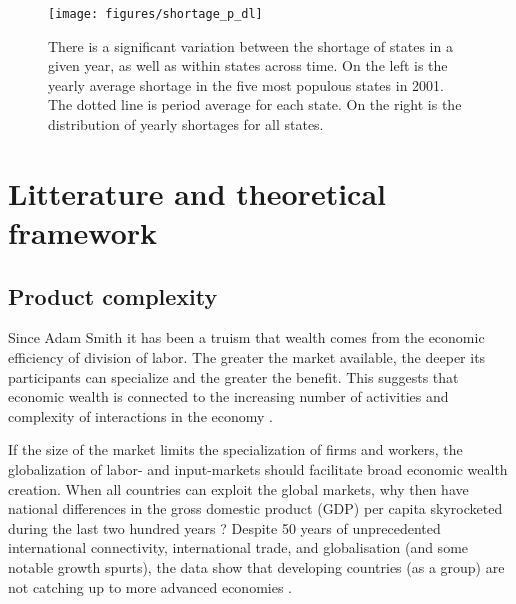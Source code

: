 \documentclass[11pt]{article}
\begin{document}
\begin{figure}[htpb]
	\centering
	\label{fig:shortage_p_dl}
	\texttt{[image: figures/shortage\_p\_dl]}
	\caption[Variation in electricity shortages in Indian states]{There is a significant variation between the shortage of states in a given year, as well as within states across time. On the left is the yearly average shortage in the five most populous states in 2001. The dotted line is period average for each state. On the right is the distribution of yearly shortages for all states.}%
	\label{fig:shortage_dist}
\end{figure}


\newpage

\section{Litterature and theoretical framework}%
\label{sec:framework}


\subsection{Product complexity}
\label{sec:frame-product-complexity}

Since Adam Smith it has been a truism that wealth comes from the economic efficiency of division of labor. The greater the market available, the deeper its participants can specialize and the greater the benefit. This suggests that economic wealth is connected to the increasing number of activities and complexity of interactions in the economy \citep{romer_endogenous_1990}.

If the size of the market limits the specialization of firms and workers, the globalization of labor- and input-markets should facilitate broad economic wealth creation. When all countries can exploit the global markets, why then have national differences in the gross domestic product (GDP) per capita skyrocketed during the last two hundred years \citep{pritchett_divergence_1997}? Despite 50 years of unprecedented international connectivity, international trade, and globalisation (and some notable growth spurts), the data show that developing countries (as a group) are not catching up to more advanced economies \citep{johnson_what_2020}.
\end{document}
